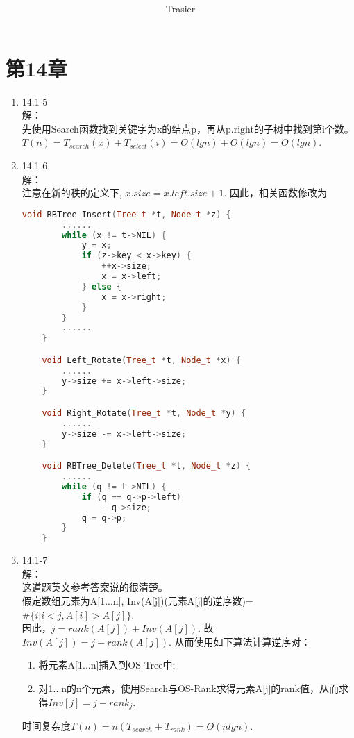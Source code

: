 \documentclass[UTF8]{ctexart}
\begin{document}
\title{\\}
\vspace{2cm}
\author{\Large Trasier}
\date{}
\maketitle

\section*{第14章}
\begin{enumerate}
    \item 14.1-5 \\
    解：\\
        先使用Search函数找到关键字为x的结点p，再从p.right的子树中找到第i个数。\\
		$T(n) = T_{search}(x) + T_{select}(i) = O(lgn) + O(lgn) = O(lgn)$.
		
	
	\item 14.1-6 \\
	解：\\
		注意在新的秩的定义下, $x.size = x.left.size + 1$. 因此，相关函数修改为
	\begin{lstlisting}[language=C++]
	void RBTree_Insert(Tree_t *t, Node_t *z) {
		......
		while (x != t->NIL) {
			y = x;
			if (z->key < x->key) {
				++x->size;
				x = x->left;
			} else {
				x = x->right;
			}
		}
		......
	}

	void Left_Rotate(Tree_t *t, Node_t *x) {
		......
		y->size += x->left->size;
	}

	void Right_Rotate(Tree_t *t, Node_t *y) {
		......
		y->size -= x->left->size;
	}

	void RBTree_Delete(Tree_t *t, Node_t *z) {
		......
		while (q != t->NIL) {
			if (q == q->p->left)
				--q->size;
			q = q->p;
		}
	}
	\end{lstlisting}
	
	\item 14.1-7 \\
	解：\\
		这道题英文参考答案说的很清楚。\\
		假定数组元素为A[1...n],
		Inv(A[j])(元素A[j]的逆序数)=$\#\{i|i<j, A[i]>A[j]\}$. \\
		因此，$j = rank(A[j]) + Inv(A[j])$.
		故$Inv(A[j]) = j - rank(A[j])$. 从而使用如下算法计算逆序对：
		\begin{enumerate}[(1)]
			\item 将元素A[1...n]插入到OS-Tree中;
			\item 对1...n的n个元素，使用Search与OS-Rank求得元素A[j]的rank值，从而求得$Inv[j] = j - rank_j$.
		\end{enumerate}
		时间复杂度$T(n) = n(T_{search} + T_{rank}) = O(nlgn)$.
	

\end{enumerate}
\end{document}
